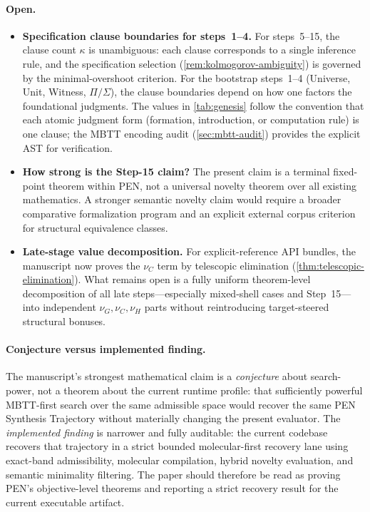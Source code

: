 \documentclass[11pt,a4paper]{article}
\theoremstyle{plain}
\theoremstyle{definition}
\theoremstyle{remark}
\begin{document}
\paragraph{Open.}
\begin{itemize}[nosep]
    \item \textbf{Specification clause boundaries for steps~1--4.}
    For steps~5--15, the clause count $\kappa$ is unambiguous: each clause corresponds to a single inference rule, and the specification selection (\cref{rem:kolmogorov-ambiguity}) is governed by the minimal-overshoot criterion.
    For the bootstrap steps~1--4 (Universe, Unit, Witness, $\Pi/\Sigma$), the clause boundaries depend on how one factors the foundational judgments.
    The values in \cref{tab:genesis} follow the convention that each atomic judgment form (formation, introduction, or computation rule) is one clause; the MBTT encoding audit (\cref{sec:mbtt-audit}) provides the explicit AST for verification.
    \item \textbf{How strong is the Step-15 claim?}
    The present claim is a terminal fixed-point theorem within PEN, not a universal novelty theorem over all existing mathematics.
    A stronger semantic novelty claim would require a broader comparative formalization program and an explicit external corpus criterion for structural equivalence classes.
    \item \textbf{Late-stage value decomposition.}
    For explicit-reference API bundles, the manuscript now proves the $\nu_C$ term by telescopic elimination (\cref{thm:telescopic-elimination}).
    What remains open is a fully uniform theorem-level decomposition of all late steps---especially mixed-shell cases and Step~15---into independent $\nu_G,\nu_C,\nu_H$ parts without reintroducing target-steered structural bonuses.
\end{itemize}

\paragraph{Conjecture versus implemented finding.}
The manuscript's strongest mathematical claim is a \emph{conjecture} about search-power, not a theorem about the current runtime profile: that sufficiently powerful MBTT-first search over the same admissible space would recover the same PEN Synthesis Trajectory without materially changing the present evaluator.
The \emph{implemented finding} is narrower and fully auditable: the current codebase recovers that trajectory in a strict bounded molecular-first recovery lane using exact-band admissibility, molecular compilation, hybrid novelty evaluation, and semantic minimality filtering.
The paper should therefore be read as proving PEN's objective-level theorems and reporting a strict recovery result for the current executable artifact.
\end{document}
